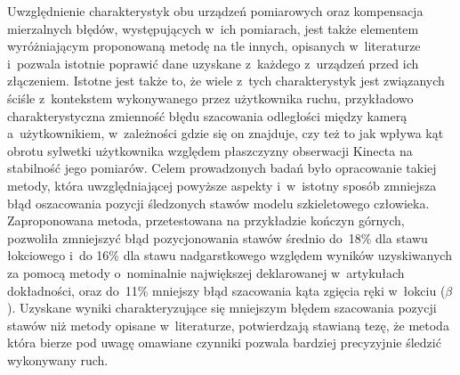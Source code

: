 Uwzględnienie charakterystyk obu urządzeń pomiarowych oraz kompensacja mierzalnych błędów, występujących w~ich pomiarach, jest także elementem wyróżniającym proponowaną metodę na tle innych, opisanych w~literaturze i~pozwala istotnie poprawić dane uzyskane z~każdego z~urządzeń przed ich złączeniem. Istotne jest także to, że wiele z~tych charakterystyk jest związanych ściśle z~kontekstem wykonywanego przez użytkownika ruchu, przykładowo charakterystyczna zmienność błędu szacowania odległości między kamerą a~użytkownikiem, w~zależności gdzie się on znajduje, czy też to jak wpływa kąt obrotu sylwetki użytkownika względem płaszczyzny obserwacji Kinecta na stabilność jego pomiarów. Celem prowadzonych badań było opracowanie takiej metody, która uwzględniającej powyższe aspekty i~w~istotny sposób zmniejsza błąd oszacowania pozycji śledzonych stawów modelu szkieletowego człowieka. Zaproponowana metoda, przetestowana na przykładzie kończyn górnych, pozwoliła zmniejszyć błąd pozycjonowania stawów średnio do~18\% dla stawu łokciowego i~do 16\% dla stawu nadgarstkowego względem wyników uzyskiwanych za pomocą metody o~nominalnie największej deklarowanej w~artykułach dokładności, oraz do~11\% mniejszy błąd szacowania kąta zgięcia ręki w~łokciu ($\beta$). Uzyskane wyniki charakteryzujące się mniejszym błędem szacowania pozycji stawów niż metody opisane w~literaturze, potwierdzają stawianą tezę, że metoda która bierze pod uwagę omawiane czynniki pozwala bardziej precyzyjnie śledzić wykonywany ruch.\\

